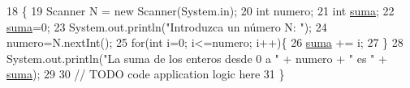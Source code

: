 \begin{DoxyCode}
18                                            \{
19         Scanner N = \textcolor{keyword}{new} Scanner(System.in);
20         \textcolor{keywordtype}{int} numero;
21         \textcolor{keywordtype}{int} \mbox{\hyperlink{namespacesuma}{suma}};
22         \mbox{\hyperlink{namespacesuma}{suma}}=0;
23         System.out.println(\textcolor{stringliteral}{"Introduzca un número N: "});
24         numero=N.nextInt();
25         \textcolor{keywordflow}{for}(\textcolor{keywordtype}{int} i=0; i<=numero; i++)\{
26             \mbox{\hyperlink{namespacesuma}{suma}} += i;
27         \}
28         System.out.println(\textcolor{stringliteral}{"La suma de los enteros desde 0 a "} + numero + \textcolor{stringliteral}{" es "} + 
      \mbox{\hyperlink{namespacesuma}{suma}});    
29                 
30         \textcolor{comment}{// TODO code application logic here}
31     \}
\end{DoxyCode}
